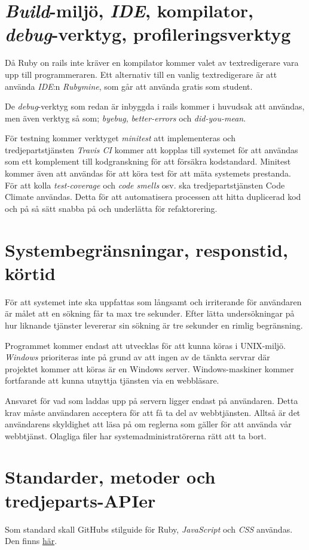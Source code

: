 \documentclass[a4paper,12pt,oneside,final]{extbook}
\begin{document}
\section{\emph{Build}-miljö, \emph{IDE}, kompilator, \emph{debug}-verktyg, profileringsverktyg}
Då Ruby on rails inte kräver en kompilator kommer valet av textredigerare
vara upp till programmeraren. Ett alternativ till en vanlig textredigerare
är att använda \emph{IDE}:n \emph{Rubymine}, som går att använda gratis som
student.

De \emph{debug}-verktyg som redan är inbyggda i rails kommer i huvudsak att
användas, men även verktyg så som; \emph{byebug}, \emph{better-errors} och
\emph{did-you-mean}.

För testning kommer verktyget \emph{minitest} att implementeras och
tredjepartstjänsten \emph{Travis CI} kommer att kopplas till systemet för
att användas som ett komplement till kodgranskning för att försäkra kodstandard.
Minitest kommer även att användas för att köra test för att mäta systemets prestanda.
För att kolla \emph{test-coverage} och \emph{code smells} osv. ska tredjepartstjänsten
Code Climate användas. Detta för att automatisera processen att hitta duplicerad
kod och på så sätt snabba på och underlätta för refaktorering.

\section{Systembegränsningar, responstid, körtid}
För att systemet inte ska uppfattas som långsamt och irriterande för användaren
är målet att en sökning får ta max tre sekunder. Efter lätta undersökningar på
hur liknande tjänster levererar sin sökning är tre sekunder en rimlig begränsning.

Programmet kommer endast att utvecklas för att kunna köras i UNIX-miljö.
\emph{Windows} prioriteras inte på grund av att ingen av de tänkta servrar där
projektet kommer att köras är en Windows server. Windows-maskiner kommer
fortfarande att kunna utnyttja tjänsten via en webbläsare.

Ansvaret för vad som laddas upp på servern ligger endast på användaren.
Detta krav måste användaren acceptera för att få ta del av webbtjänsten.
Alltså är det användarens skyldighet att läsa på om reglerna som gäller för
att använda vår webbtjänst. Olagliga filer har systemadministratörerna rätt
att ta bort.

\section{Standarder, metoder och tredjeparts-APIer}
Som standard skall GitHubs stilguide för Ruby, \emph{JavaScript} och \emph{CSS}
användas. Den finns \href{https://github.com/styleguide}{här}.
\end{document}
